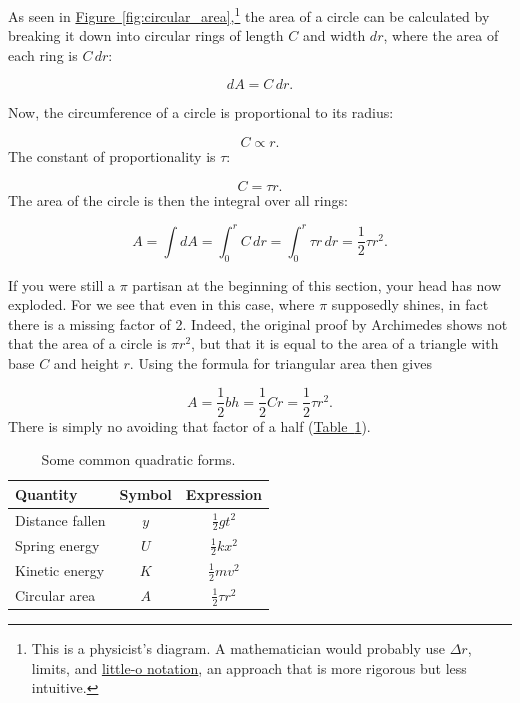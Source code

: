 \documentclass{article}
\begin{document}
As seen in \hyperref[fig:circular_area]{Figure~}\ref{fig:circular_area},\footnote{This is a physicist's diagram. A mathematician would probably use $\Delta r$, limits, and \href{http://en.wikipedia.org/wiki/Big_O_notation\#Little-o_notation}{little-o notation}, an approach that is more rigorous but less intuitive.} the area of a circle can be calculated by breaking it down into circular rings of length $C$ and width $dr$, where the area of each ring is $C\,dr$:

\[ dA = C\,dr. \]


\noindent Now, the circumference of a circle is proportional to its radius:

\[ C \propto r. \]
The constant of proportionality is $\tau$:

\[ C = \tau r. \]
The area of the circle is then the integral over all rings:

\[ A = \int dA = \int_0^r C\,dr = \int_0^r \tau r\,dr = \textstyle{\frac{1}{2}} \tau r^2. \]

If you were still a $\pi$ partisan at the beginning of this section, your head has now exploded. For we see that even in this case, where $\pi$ supposedly shines, in fact there is a missing factor of 2. Indeed, the original proof by Archimedes shows not that the area  of a circle is $\pi r^2$, but that it is equal to the area of a triangle with base $C$ and height $r$. Using the formula for triangular area then gives

\[
  A = \textstyle{\frac{1}{2}} bh = \textstyle{\frac{1}{2}}Cr = \textstyle{\frac{1}{2}}\tau r^2.
\]
There is simply no avoiding that factor of a half  (\hyperref[table:quadratic_forms]{Table~}\ref{table:quadratic_forms}).

\begin{table}
\begin{center}
\begin{tabular}{lcc}
Quantity & Symbol & Expression \\ \hline
Distance fallen & $y$ & $\textstyle{\frac{1}{2}}gt^2$ \\
Spring energy & $U$ & $\textstyle{\frac{1}{2}}kx^2$ \\
Kinetic energy & $K$ & $\textstyle{\frac{1}{2}}mv^2$ \\
Circular area & $A$ & $\textstyle{\frac{1}{2}}\tau r^2$
\end{tabular}
\end{center}
\caption{Some common quadratic forms.\label{table:quadratic_forms}}
\end{table}
\end{document}
